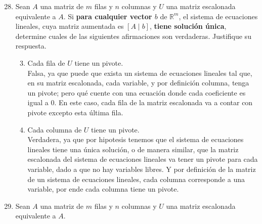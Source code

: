 \documentclass{article}
\begin{document}
\begin{enumerate}
    \setcounter{enumi}{27}
    \item Sean \(A\) una matriz de \(m\) filas y \(n\) columnas y \(U\) una matriz escalonada equivalente a \(A\). Si \textbf{para cualquier vector \(b\)}
        de \(\mathbb{R}^m\), el sistema de ecuaciones lineales, cuya matriz aumentada es \(\left[A \mid b\right]\), \textbf{tiene solución única}, 
        determine cuales de las siguientes afirmaciones son verdaderas. Justifique su respuesta.
        \begin{enumerate}[label=\listAlph]
            \setcounter{enumii}{2}
            \item Cada fila de \(U\) tiene un pivote. \\
                Falsa, ya que puede que exista un sistema de ecuaciones lineales tal que, en su matriz escalonada, cada variable, y por definición columna, tenga un pivote; 
                pero qué cuente con una ecuación donde cada coeficiente es igual a 0. En este caso, cada fila de la matriz escalonada va a contar con pivote excepto esta última fila.
            \item Cada columna de \(U\) tiene un pivote. \\
                Verdadera, ya que por hipotesis tenemos que el sistema de ecuaciones lineales tiene una única solución, o de manera similar, 
                que la matriz escalonada del sistema de ecuaciones lineales va tener un pivote para cada variable, dado a que no hay variables libres.
                Y por definición de la matriz de un sistema de ecuaciones lineales, cada columna corresponde a una variable, por ende cada columna tiene un pivote.
        \end{enumerate}
    \item Sean \(A\) una matriz de \(m\) filas y \(n\) columnas y \(U\) una matriz escalonada equivalente a \(A\). 

\end{enumerate}
\end{document}
